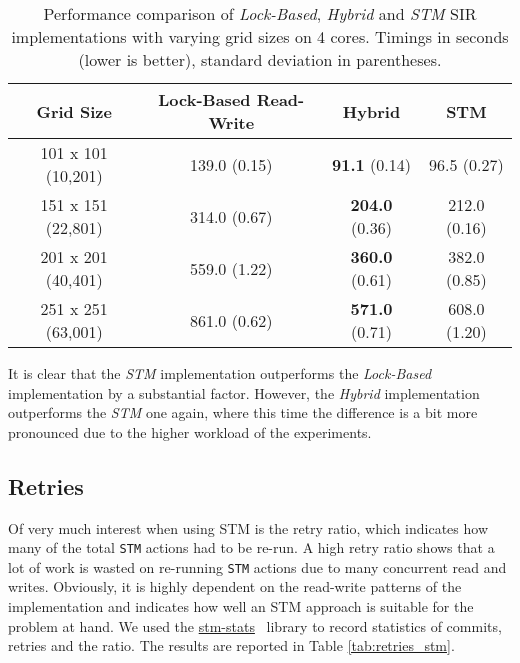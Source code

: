\begin{table}
	\centering
  	\begin{tabular}{ c || c | c | c  }
        Grid Size           & Lock-Based Read-Write & Hybrid                 & STM            \\ \hline \hline 
   		101 x 101 (10,201)  & 139.0 (0.15)          & \textbf{91.1} (0.14)   & 96.5 (0.27)    \\ \hline
   		151 x 151 (22,801)  & 314.0 (0.67)          & \textbf{204.0} (0.36)  & 212.0 (0.16)   \\ \hline
   		201 x 201 (40,401)  & 559.0 (1.22)          & \textbf{360.0} (0.61)  & 382.0 (0.85)   \\ \hline
   		251 x 251 (63,001)  & 861.0 (0.62)          & \textbf{571.0} (0.71)  & 608.0 (1.20)   \\ \hline \hline
  	\end{tabular}

  	\caption{Performance comparison of \textit{Lock-Based}, \textit{Hybrid} and \textit{STM} SIR implementations with varying grid sizes on 4 cores. Timings in seconds (lower is better), standard deviation in parentheses.}
	\label{tab:sir_varyinggrid_constcores}
\end{table}

It is clear that the \textit{STM} implementation outperforms the \textit{Lock-Based} implementation by a substantial factor. However, the \textit{Hybrid} implementation outperforms the \textit{STM} one again, where this time the difference is a bit more pronounced due to the higher workload of the experiments. %

\subsection{Retries}
Of very much interest when using STM is the retry ratio, which indicates how many of the total \texttt{STM} actions had to be re-run. A high retry ratio shows that a lot of work is wasted on re-running \texttt{STM} actions due to many concurrent read and writes. Obviously, it is highly dependent on the read-write patterns of the implementation and indicates how well an STM approach is suitable for the problem at hand. We used the \href{http://hackage.haskell.org/package/stm-stats}{stm-stats}~\cite{stm_stats_library} library to record statistics of commits, retries and the ratio. The results are reported in Table \ref{tab:retries_stm}.

